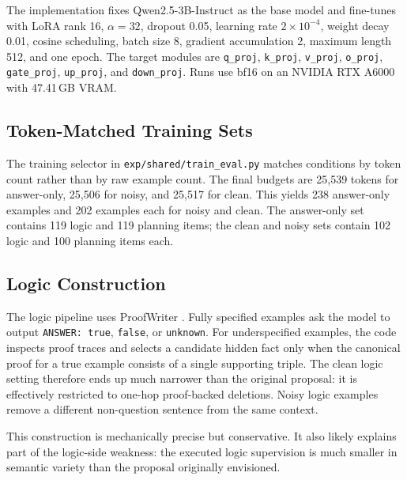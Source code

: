 The implementation fixes Qwen2.5-3B-Instruct as the base model and fine-tunes with LoRA rank 16, $\alpha=32$, dropout 0.05, learning rate $2\times10^{-4}$, weight decay 0.01, cosine scheduling, batch size 8, gradient accumulation 2, maximum length 512, and one epoch. The target modules are \texttt{q\_proj}, \texttt{k\_proj}, \texttt{v\_proj}, \texttt{o\_proj}, \texttt{gate\_proj}, \texttt{up\_proj}, and \texttt{down\_proj}. Runs use bf16 on an NVIDIA RTX A6000 with 47.41\,GB VRAM.

\subsection{Token-Matched Training Sets}
The training selector in \texttt{exp/shared/train\_eval.py} matches conditions by token count rather than by raw example count. The final budgets are 25{,}539 tokens for answer-only, 25{,}506 for noisy, and 25{,}517 for clean. This yields 238 answer-only examples and 202 examples each for noisy and clean. The answer-only set contains 119 logic and 119 planning items; the clean and noisy sets contain 102 logic and 100 planning items each.

\subsection{Logic Construction}
The logic pipeline uses ProofWriter \citep{tafjord2021proofwriter}. Fully specified examples ask the model to output \texttt{ANSWER: true}, \texttt{false}, or \texttt{unknown}. For underspecified examples, the code inspects proof traces and selects a candidate hidden fact only when the canonical proof for a true example consists of a single supporting triple. The clean logic setting therefore ends up much narrower than the original proposal: it is effectively restricted to one-hop proof-backed deletions. Noisy logic examples remove a different non-question sentence from the same context.

This construction is mechanically precise but conservative. It also likely explains part of the logic-side weakness: the executed logic supervision is much smaller in semantic variety than the proposal originally envisioned.

